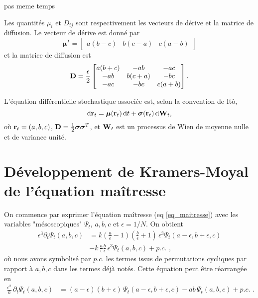 \documentclass[openany,a4paper,12pt]{article}
\begin{document}
{\color{red} pas meme temps} 

\par Les quantités $\mu_i$ et $D_{ij}$ sont respectivement les vecteurs de dérive et la matrice de diffusion. Le vecteur de dérive est donné par 
%
\begin{equation}\label{mu_i_expr}
	\boldsymbol\mu^T = 
	\begin{bmatrix} a(b-c) & b(c-a) & c(a-b) \end{bmatrix}
\end{equation}
%
et la matrice de diffusion est
%
\begin{equation}\label{D_ij_expr}
	\bold D = \frac{\epsilon}{2}
	\begin{bmatrix}
	a(b+c) & -ab & -ac \\
	-ab & b(c+a) & -bc \\
	-ac & -bc & c(a+b)
	\end{bmatrix}.
\end{equation}
%

\par L'équation différentielle stochastique associée est, selon la convention de Itô,
%
\begin{equation}\label{SDE_abc}
	\dd \bold r_t = \boldsymbol \mu (\bold r_t) \, \dd t + \boldsymbol \sigma(\bold r_t) \, \dd \bold W_t,
\end{equation}
où $\bold r_t = (a,b,c)$, $\bold D = \frac 12 \boldsymbol \sigma \boldsymbol \sigma^T$, et $\bold W_t$ est un processus de Wien de moyenne nulle et de variance unité.


\section{Développement de Kramers-Moyal de l'équation maîtresse}

\par On commence par exprimer l'équation maîtresse (eq \ref{eq_maitresse}) avec les variables "mésoscopiques" $\Psi_t$, $a,b,c$ et $\epsilon=1/N$. On obtient
%
\begin{equation}\label{eq_maitresse_minuscules}
\begin{split}
	\epsilon ^3 \partial_t \Psi_t(a,b,c) 
	&= k \left( \frac a \epsilon - 1 \right) \left( \frac b \epsilon + 1\right)  \, \epsilon^3 \Psi_t(a-\epsilon, b+\epsilon, c) \\
	&- k\, \frac a \epsilon \frac b \epsilon \, \epsilon^3 \Psi_t(a,b,c) + p.c. \,\, ,
\end{split}
\end{equation}
%
où nous avons symbolisé par $p.c.$ les termes issus de permutations cycliques par rapport à $a,b,c$ dans les termes déjà notés. Cette équation peut être réarrangée en
%
\begin{equation}\label{eq_maitresse_minuscules_clean}
\begin{split}
	\frac{\epsilon^2}{k}\, \partial_t \Psi_t(a,b,c) 
	&= (a-\epsilon)(b+\epsilon)  \, \Psi_t(a-\epsilon, b+\epsilon, c) 
	- ab \, \Psi_t(a,b,c) + p.c. \,\, .
\end{split}
\end{equation}
%
\end{document}
